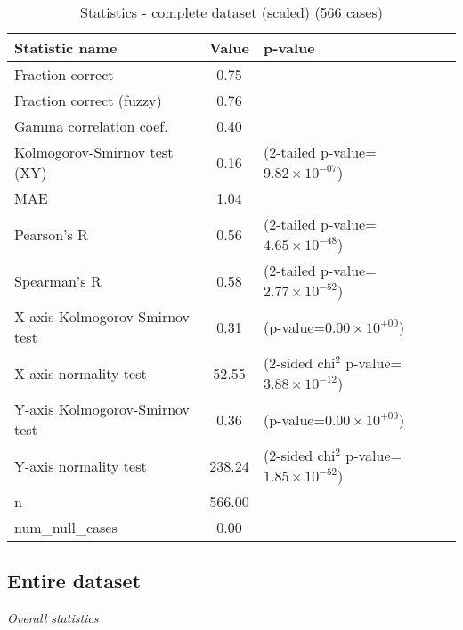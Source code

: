 \documentclass[10pt, letterpaper, oneside, titlepage, landscape]{scrreprt}
\begin{document}
\begin{table}[H]\begin{center}
\begin{tabular}{ l S[table-format=3.2] l}
Statistic name & {Value} & p-value\\
\hline
Fraction correct & 0.75 & \\
Fraction correct (fuzzy) & 0.76 & \\
Gamma correlation coef. & 0.40 & \\
Kolmogorov-Smirnov test (XY) & 0.16 & (2-tailed p-value=$9.82\times10^{-07}$)\\
MAE & 1.04 & \\
Pearson's R & 0.56 & (2-tailed p-value=$4.65\times10^{-48}$)\\
Spearman's R & 0.58 & (2-tailed p-value=$2.77\times10^{-52}$)\\
X-axis Kolmogorov-Smirnov test & 0.31 & (p-value=$0.00\times10^{+00}$)\\
X-axis normality test & 52.55 & (2-sided chi$^{2}$ p-value=$3.88\times10^{-12}$)\\
Y-axis Kolmogorov-Smirnov test & 0.36 & (p-value=$0.00\times10^{+00}$)\\
Y-axis normality test & 238.24 & (2-sided chi$^{2}$ p-value=$1.85\times10^{-52}$)\\
n & 566.00 & \\
num\_null\_cases & 0.00 & \\
\end{tabular}
\caption{Statistics - complete dataset (scaled) (566 cases)}
\end{center}\end{table}


\subsection{Entire dataset}
\textit{Overall statistics}
\end{document}
